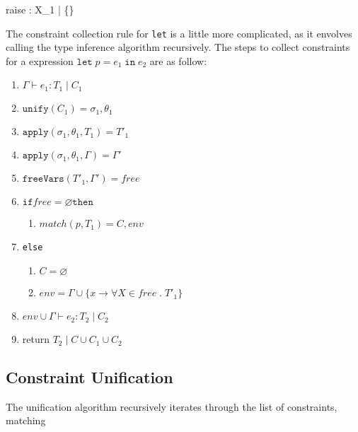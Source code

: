 \documentclass{article}
\begin{document}
    {\Gamma \vdash raise : X_1 \; | \; \{\}}

The constraint collection rule for \texttt{let} is a little more complicated, as it envolves calling the type inference algorithm recursively.
The steps to collect constraints for a expression $\texttt{let} \; p = e_1 \; \texttt{in} \; e_2$ are as follow:

\begin{enumerate}
  \item $\Gamma \vdash e_1 : T_1 \; | \; C_1$

  \item $\texttt{unify}(C_1) = \sigma_1, \theta_1$

  \item $\texttt{apply}(\sigma_1, \theta_1, T_1) = T'_1$

  \item $\texttt{apply}(\sigma_1, \theta_1, \Gamma) = \Gamma'$

  \item $\texttt{freeVars}(T'_1, \Gamma') = free$

  \item $\texttt{if} free = \varnothing \texttt{then}$

  \begin{enumerate}
    \item $match(p, T_1) = C, env$
  \end{enumerate}

  \item \texttt{else}

  \begin{enumerate}
    \item $C = \varnothing$
    \item $env = \Gamma \cup \{x \rightarrow \forall X \in free \; . \; T'_1 \}$
  \end{enumerate}

  \item $env \cup \Gamma \vdash e_2 : T_2 \; | \; C_2$

  \item return $T_2 \; | \; C \cup C_1 \cup C_2$

\end{enumerate}

\subsection{Constraint Unification}

The unification algorithm recursively iterates through the list of constraints, matching
\end{document}
